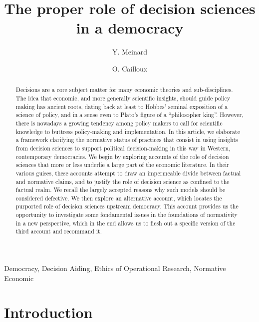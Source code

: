 \documentclass[preprint,11pt]{elsarticle}
\begin{document}
\title{The proper role of decision sciences in a democracy}
\author[ld]{Y. Meinard}
\author[ld]{O. Cailloux}
\address[ld]{Universit\'e Paris-Dauphine, PSL Research University, CNRS, UMR [7243], LAMSADE, 75016 PARIS, FRANCE}



\begin{abstract}
Decisions are a core subject matter for many economic theories and sub-disciplines. The idea that economic, and more generally scientific insights, should guide policy making has ancient roots, dating back at least to Hobbes’ seminal exposition of a science of policy, and in a sense even to Plato's figure of a ``philosopher king''. However, there is nowadays a growing tendency among policy makers to call for scientific knowledge to buttress policy-making and implementation. In this article, we elaborate a framework clarifying the normative status of practices that consist in using insights from decision sciences to support political decision-making in this way in Western, contemporary democracies. We begin by exploring accounts of the role of decision sciences that more or less underlie a large part of the economic literature. In their various guises, these accounts attempt to draw an impermeable divide between factual and normative claims, and to justify the role of decision science as confined to the factual realm. We recall the largely accepted reasons why such models should be considered defective. We then explore an alternative account, which locates the purported role of decision sciences upstream democracy. This account provides us the opportunity to investigate some fondamental issues in the foundations of normativity in a new perspective, which in the end allows us to flesh out a specific version of the third account and recommand it.

\end{abstract}

\begin{keyword}
Democracy, Decision Aiding, Ethics of Operational Research, Normative Economic
\end{keyword}

\maketitle

\section{Introduction}
\end{document}
